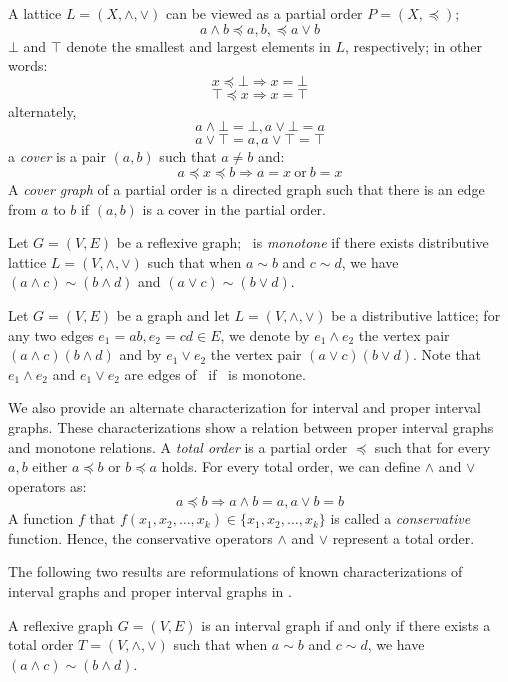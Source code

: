 A lattice \(L=(X,\wedge,\vee)\) can be viewed as a partial order \(P=(X,\preceq)\);
\[ a\wedge b \preceq a,b, \preceq a\vee b\]
\(\bot\) and \(\top\) denote the smallest and largest elements in \(L\), respectively; in other words:
\[x \preceq \bot \Rightarrow x = \bot \]
\[\top \preceq x \Rightarrow x = \top \]
alternately,
\[a \wedge \bot = \bot, a \vee \bot = a\]
\[a \vee \top = a, a \vee \top = \top\]
a \emph{cover} is a pair \((a,b)\) such that \(a \neq b\) and:
\[a \preceq x \preceq b \Rightarrow a = x\ \mathrm{or}\ b = x\]
A \emph{cover graph} of a partial order is a directed graph such that there is
an edge from \(a\) to \(b\) if \((a,b)\) is a cover in the partial order.

\begin{defi} 
Let \(G=(V,E)\) be a reflexive graph; \mG\ is \emph{monotone} if there exists distributive lattice
\(L=(V, \wedge, \vee)\) such that
when \(a\sim b\) and \(c \sim d\), we have \((a \wedge c) \sim (b \wedge d)\) and \((a \vee c) \sim (b \vee d)\)\@.
\end{defi}

Let \(G=(V,E)\) be a graph and let \(L=(V, \wedge, \vee)\)  be a distributive lattice;
for any two edges \(e_1=ab, e_2=cd \in E\), we denote by
\(e_1\wedge e_2\) the vertex pair \((a\wedge c)(b \wedge d)\) and by \(e_1\vee e_2\) the vertex pair \((a \vee c)(b \vee d)\)\@.
Note that \(e_1\wedge e_2\) and \(e_1\vee e_2\) are edges of \mG\ if \mG\ is monotone.

We also provide an alternate characterization for interval and proper interval graphs.
These characterizations show a relation between proper interval graphs and monotone relations. 
A \emph{total order} is a partial order \(\preceq\) such that for every \(a, b\) either \(a \preceq b\)
or \(b \preceq a\) holds. For every total order, we can define \(\wedge\) and \(\vee\) operators as:
\[a \preceq b \Rightarrow a \wedge b = a, a \vee b = b\]
A function \(f\) that \(f(x_1,x_2,\dotsc,x_k)\in \{x_1,x_2,\dotsc,x_k\}\) is called
a \emph{conservative} function. Hence, the conservative operators \(\wedge\) and \(\vee\)
represent a total order.

The following two results are reformulations of known characterizations of interval graphs and
proper interval graphs in \cite{Gutin, hellbook}\@.
\begin{theorem} \label{thm:semimin}
A reflexive graph \(G=(V,E)\) is an interval graph if and only if there exists
a total order \(T=(V,\wedge,\vee)\) such that
when \(a\sim b\) and \(c \sim d\), we have \((a \wedge c) \sim (b \wedge d)\)\@.
\end{theorem}

